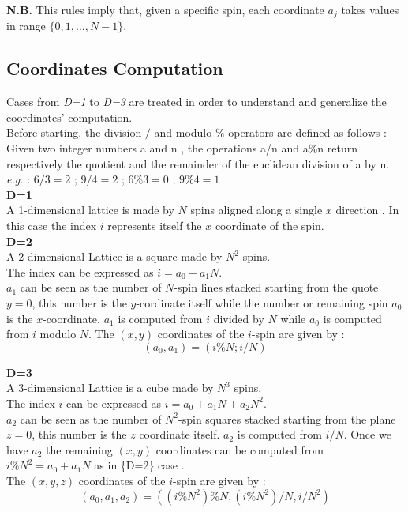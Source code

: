 \documentclass[11pt,a4paper]{article}
\begin{document}

\textbf{N.B.} This rules imply that, given a specific spin, each coordinate $a_j$ takes values in range 
$\{0,1,…,N-1\}$. \\ 



\newpage


\subsection*{Coordinates Computation}

Cases from \textit{D=1} to \textit{D=3} are treated in order to understand and generalize the coordinates’ computation. \\
Before starting, the division $/$ and modulo $\%$ operators are defined as follows : \\
Given two integer numbers a and n , the operations a/n and a\%n return respectively the quotient and the remainder of the euclidean division of a by n. \\ 
\textit{e.g.} : $6/3=2$ ; $9/4=2$ ; $6\%3=0$ ; $9\%4=1$ \\

\vspace{0.1cm} 
\textbf{D=1} \\
A 1-dimensional lattice is made by $N$ spins aligned along a single $x$ direction .
In this case the index $i$ represents itself the $x$ coordinate of the spin.\\

\textbf{D=2} \\
A 2-dimensional Lattice is a square made by $N^2$ spins.\\
The index can be expressed as $i = a_0 + a_1N$. \\
$a_1$ can be seen as the number of $N$-spin lines stacked starting from the quote $y=0$, this number is
the $y$-cordinate itself while the number or remaining spin $a_0$ is the $x$-coordinate. 
$a_1$ is computed from $i$ divided by $N$ while $a_0$ is computed from $i$ modulo $N$.
The $(x,y)$ coordinates of the $i$-spin are given by : $$(a_0,a_1)=(i\%N ; i/N)$$ 


\textbf{D=3} \\
A 3-dimensional Lattice is a cube made by $N^{3}$ spins. \\  
The index $i$ can be expressed as $i = a_0 + a_1N + a_2N^2$. \\
$a_2$ can be seen as the number of $N^2$-spin squares stacked starting from the plane $z=0$, this number is 
the $z$ coordinate itself. $a_2$ is computed from $i/N$.
Once we have $a_2$ the remaining $(x,y)$ coordinates can be computed from \\ $i\%N^2 = a_0 + a_1N$ as in \{D=2\} case .\\
The $(x,y,z)$ coordinates of the $i$-spin are given by : $$(a_0,a_1,a_2)=\left( (i\%N^2)\%N , (i\%N^2)/N , i/N^2 \right)$$ 
\end{document}
